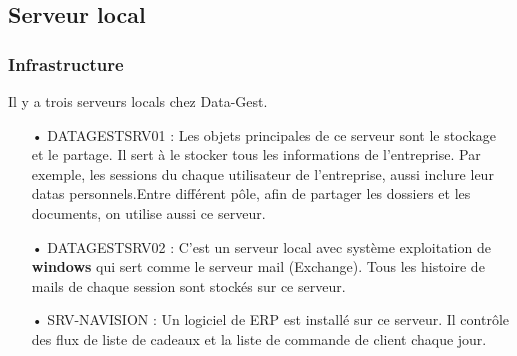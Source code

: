 \subsection{Serveur local}


\subsubsection{Infrastructure}
Il y a trois serveurs locals chez Data-Gest. 
\begin{itemize}
  \item[•]DATAGESTSRV01 : Les objets principales de ce serveur sont le stockage et le partage. Il sert à le stocker tous les informations de l'entreprise. Par exemple, les sessions du chaque utilisateur de l'entreprise, aussi inclure leur datas personnels.Entre différent pôle, afin de partager les dossiers et les documents, on utilise aussi ce serveur.
  \item[•]DATAGESTSRV02 : C'est un serveur local avec système exploitation de \textbf{windows}  qui sert comme le serveur mail (Exchange). Tous les histoire de mails de chaque session sont stockés sur ce serveur.
  \item[•]SRV-NAVISION : Un logiciel de ERP est installé sur ce serveur. Il contrôle des flux de liste de cadeaux et la liste de commande de client chaque jour.  
\end{itemize}






%
%
%
%
%


